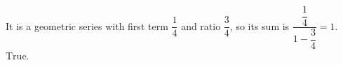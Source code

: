 It is a geometric series with first term $\dfrac14$ and ratio $\dfrac34$, so its sum is $\dfrac{\dfrac14}{1-\dfrac34}=1$. $\boxed{\text{True}}$.

